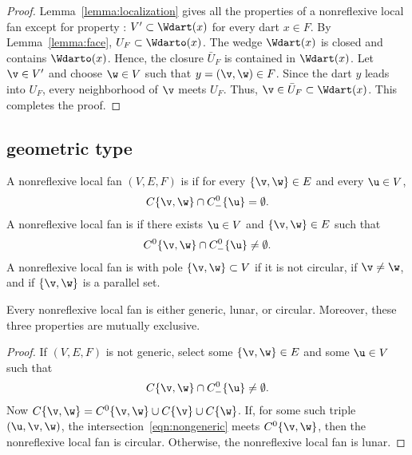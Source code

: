 \begin{proof}
  Lemma~\ref{lemma:localization} gives all the properties of a nonreflexive local fan except for property : $V'\subset \Wdart(x)$ for
  every dart $x\in F$.  By Lemma~\ref{lemma:face}, $U_F \subset
  \Wdarto(x)$.  The wedge $\Wdart(x)$ is closed and contains
  $\Wdarto(x)$. Hence, the closure $\bar U_F$ is contained in
  $\Wdart(x)$.  Let $\v\in V'$ and choose $\w\in V$ such that
  $y=(\v,\w)\in F$.
  Since the dart $y$ leads into $U_F$, every neighborhood of $\v$
  meets $U_F$.  Thus, $\v\in \bar U_F\subset \Wdart(x)$.  This
  completes the proof.
\end{proof}


\subsection{geometric type}\label{sec:types}

\begin{definition}
A nonreflexive local fan $(V,E,F)$ is   if for every $\{\v,\w\}\in E$
and every $\u\in V$, 
\[ 
C\{\v,\w\}\cap C^0_-\{\u\} = \emptyset.
\] 
A nonreflexive local fan is   if there exists $\u\in V$ and
$\{\v,\w\}\in E$ such that
\[ 
C^0\{\v,\w\}\cap C^0_-\{\u\}\ne \emptyset.
\] 
A nonreflexive local fan is  with pole $\{\v,\w\} \subset V$ if it is not
circular, if $\v\ne\w$, and if $\{\v,\w\}$ is a parallel set.
\end{definition}
%
%
%


\begin{lemma}[trichotomy]%
Every nonreflexive local fan is either
generic, lunar, or circular.  Moreover, these three properties are
mutually exclusive.
\end{lemma}
%
%
%
%
%

\begin{proof} If $(V,E,F)$ is not generic,  select some $\{\v,\w\}\in E$
and some $\u\in V$ such that
\begin{equation}\label{eqn:nongeneric}
C\{\v,\w\}\cap C^0_-\{\u\} \ne \emptyset.
\end{equation}
Now $C\{\v,\w\} = C^0\{\v,\w\} \cup C\{\v\}\cup C\{\w\}$.  If, for
some such triple $(\u,\v,\w)$, the
intersection~\eqref{eqn:nongeneric} meets $C^0\{\v,\w\}$, then the
nonreflexive local fan is circular.  Otherwise, the nonreflexive local fan is lunar.
\end{proof}

